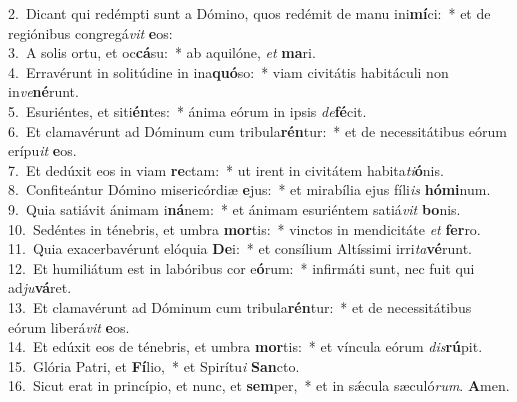 {2.~}Dicant qui redémpti sunt a Dómino, quos redémit de manu ini\textbf{mí}ci:~* et de regiónibus congregá\textit{vit} \textbf{e}os:\\
{3.~}A solis ortu, et oc\textbf{cá}su:~* ab aquilóne, \textit{et} \textbf{ma}ri.\\
{4.~}Erravérunt in solitúdine in ina\textbf{quó}so:~* viam civitátis habitáculi non in\textit{ve}\textbf{né}runt.\\
{5.~}Esuriéntes, et siti\textbf{én}tes:~* ánima eórum in ipsis \textit{de}\textbf{fé}cit.\\
{6.~}Et clamavérunt ad Dóminum cum tribula\textbf{rén}tur:~* et de necessitátibus eórum erípu\textit{it} \textbf{e}os.\\
{7.~}Et dedúxit eos in viam \textbf{re}ctam:~* ut irent in civitátem habita\textit{ti}\textbf{ó}nis.\\
{8.~}Confiteántur Dómino misericórdiæ \textbf{e}jus:~* et mirabília ejus fíli\textit{is} \textbf{hó}\textbf{mi}num.\\
{9.~}Quia satiávit ánimam i\textbf{ná}nem:~* et ánimam esuriéntem satiá\textit{vit} \textbf{bo}nis.\\
{10.~}Sedéntes in ténebris, et umbra \textbf{mor}tis:~* vinctos in mendicitáte \textit{et} \textbf{fer}ro.\\
{11.~}Quia exacerbavérunt elóquia \textbf{De}i:~* et consílium Altíssimi irri\textit{ta}\textbf{vé}runt.\\
{12.~}Et humiliátum est in labóribus cor e\textbf{ó}rum:~* infirmáti sunt, nec fuit qui ad\textit{ju}\textbf{vá}ret.\\
{13.~}Et clamavérunt ad Dóminum cum tribula\textbf{rén}tur:~* et de necessitátibus eórum liberá\textit{vit} \textbf{e}os.\\
{14.~}Et edúxit eos de ténebris, et umbra \textbf{mor}tis:~* et víncula eórum \textit{dis}\textbf{rú}pit.\\
{15.~}Glória Patri, et \textbf{Fí}lio,~* et Spirítu\textit{i} \textbf{San}cto.\\
{16.~}Sicut erat in princípio, et nunc, et \textbf{sem}per,~* et in sǽcula sæculó\textit{rum}. \textbf{A}men.\\

